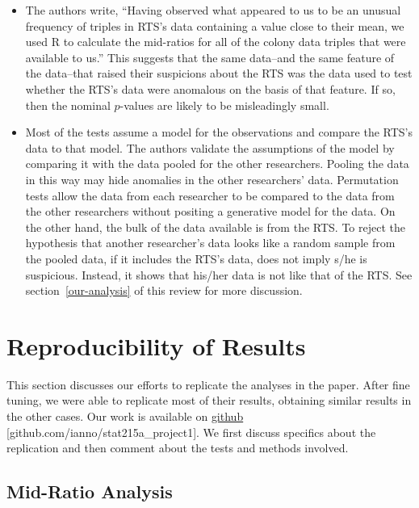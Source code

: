 \documentclass{article}
\begin{document}
\begin{itemize}
\item
  The authors write, “Having observed what appeared to us to be an unusual frequency of triples in RTS's data containing a value close to their mean, we used R to calculate the mid-ratios for all of the colony data triples that were available to us.” This suggests that the same data--and the same feature of the data--that raised their suspicions about the RTS was the data used to test whether the RTS's data were anomalous on the basis of that feature. If so, then the nominal $p$-values are likely to be misleadingly small.

\item
  Most of the tests assume a model for the observations and compare the RTS's data to that model.
  The authors validate the assumptions of the model by comparing it with the data pooled for the other researchers.
  Pooling the data in this way may hide anomalies in the other researchers' data.
  Permutation tests allow the data from each researcher to be compared to the data from the other researchers without positing a generative model for the data.
  On the other hand, the bulk of the data available is from the RTS.
  To reject the hypothesis that another researcher's data looks like a random sample from the pooled data, if it includes the RTS's data, does not imply s/he is suspicious.
  Instead, it shows that his/her data is not like that of the RTS.
  See section~\ref{our-analysis} of this review for more discussion.
\end{itemize}

    \section{Reproducibility of Results}\label{reproducibility-of-results}

This section discusses our efforts to replicate the analyses in the paper.
After fine tuning, we were able to replicate most of
their results, obtaining similar results in the other cases.
Our work is available on \hyperlink{https://github.com/ianno/stat215a_project1}{github} [github.com/ianno/stat215a\_project1]. We first discuss specifics about the replication and then comment about the tests and methods involved.


    \subsection{Mid-Ratio Analysis}\label{mid-ratio-analysis}
\end{document}
